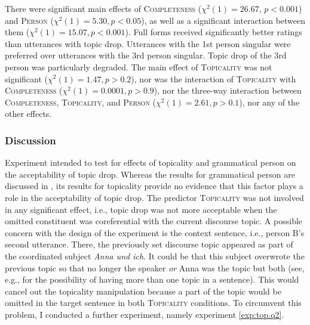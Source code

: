 \noindent
There were significant main effects of \textsc{Completeness} ($\chi^2(1) = 26.67$, $p < 0.001$) and \textsc{Person} ($\chi^2(1) = 5.30, p < 0.05$), as well as a significant interaction between them ($\chi^2(1) = 15.07, p < 0.001$).
Full forms received significantly better ratings than utterances with topic drop.
Utterances with the 1st person singular were preferred over utterances with the 3rd person singular.
Topic drop of the 3rd person was particularly degraded.
The main effect of \textsc{Topicality} was not significant ($\chi^2(1) = 1.47, p > 0.2$), nor was the interaction of \textsc{Topicality} with \textsc{Completeness} ($\chi^2(1) = 0.0001, p > 0.9$), nor the three-way interaction between \textsc{Completeness}, \textsc{Topicality}, and \textsc{Person} ($\chi^2(1) = 2.61, p > 0.1$), nor any of the other effects.

\subsubsection{Discussion}\label{sec:exp.top.q1.diss}
Experiment  intended to test for effects of topicality and grammatical person on the acceptability of topic drop.
Whereas the results for grammatical person are discussed in , its results for topicality provide no evidence that this factor plays a role in the acceptability of topic drop.
The predictor \textsc{Topicality} was not involved in any significant effect, i.e., topic drop was not more acceptable when the omitted constituent was coreferential with the current discourse topic. 
A possible concern with the design of the experiment is the context sentence, i.e., person B's second utterance.
There, the previously set discourse topic  appeared as part of the coordinated subject \textit{Anna und ich}.
It could be that this subject overwrote the previous topic so that no longer the speaker \textit{or} Anna was the topic but both (see, e.g., \cite[42--43]{krifka2007} for the possibility of having more than one topic in a sentence).
This would cancel out the topicality manipulation because a part of the topic would be omitted in the target sentence in both \textsc{Topicality} conditions.
To circumvent this problem, I conducted a further experiment, namely experiment \ref*{exp:top.q2}.
 
\label{exp:top.q2}
